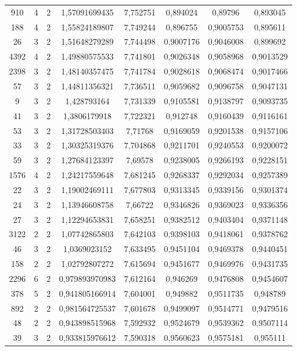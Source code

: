 \begin{longtable}{|c|c|c|c|c|c|c|c|}
910 & 4 & 2 & 1,57091699435 & 7,752751 & 0,894024 & 0,89796 & 0,893045 \\
188 & 4 & 2 & 1,55824189807 & 7,749244 & 0,896755 & 0,9005753 & 0,895611 \\
26 & 3 & 2 & 1,51648279289 & 7,744498 & 0,9007176 & 0,9046008 & 0,899692 \\
4392 & 4 & 2 & 1,49880575533 & 7,741801 & 0,9026348 & 0,9058968 & 0,9013529 \\
2398 & 3 & 2 & 1,48140357475 & 7,741784 & 0,9028618 & 0,9068474 & 0,9017466 \\
57 & 3 & 2 & 1,44811356321 & 7,736511 & 0,9059682 & 0,9096758 & 0,9047131 \\
9 & 3 & 2 & 1,428793164 & 7,731339 & 0,9105581 & 0,9138797 & 0,9093735 \\
41 & 3 & 2 & 1,3806179918 & 7,722321 & 0,912748 & 0,9160439 & 0,9116161 \\
53 & 3 & 2 & 1,31728503403 & 7,71768 & 0,9169059 & 0,9201538 & 0,9157106 \\
33 & 3 & 2 & 1,30325319376 & 7,704868 & 0,9211701 & 0,9240553 & 0,9200072 \\
59 & 3 & 2 & 1,27684123397 & 7,69578 & 0,9238005 & 0,9266193 & 0,9228151 \\
1576 & 4 & 2 & 1,24217559648 & 7,681245 & 0,9268337 & 0,9292034 & 0,9257389 \\
22 & 3 & 2 & 1,19002469111 & 7,677803 & 0,9313345 & 0,9339156 & 0,9301374 \\
24 & 3 & 2 & 1,13946608758 & 7,66722 & 0,9346826 & 0,9369023 & 0,9336356 \\
27 & 3 & 2 & 1,12294653831 & 7,658251 & 0,9382512 & 0,9403404 & 0,9371148 \\
3122 & 2 & 2 & 1,07742865803 & 7,642103 & 0,9398103 & 0,9418061 & 0,9378762 \\
46 & 3 & 2 & 1,0369023152 & 7,633495 & 0,9451104 & 0,9469378 & 0,9440451 \\
158 & 2 & 2 & 1,02792807272 & 7,615694 & 0,9451677 & 0,9469976 & 0,9431735 \\
2296 & 6 & 2 & 0,979893970983 & 7,612164 & 0,946269 & 0,9476808 & 0,9454607 \\
378 & 5 & 2 & 0,941805166914 & 7,604001 & 0,949882 & 0,9511735 & 0,948789 \\
892 & 2 & 2 & 0,981564725537 & 7,601678 & 0,9499097 & 0,9514771 & 0,9479516 \\
48 & 2 & 2 & 0,943898515968 & 7,592932 & 0,9524679 & 0,9539362 & 0,9507114 \\
39 & 3 & 2 & 0,933815976612 & 7,590318 & 0,9560623 & 0,9575181 & 0,955111 \\

\end{longtable}
